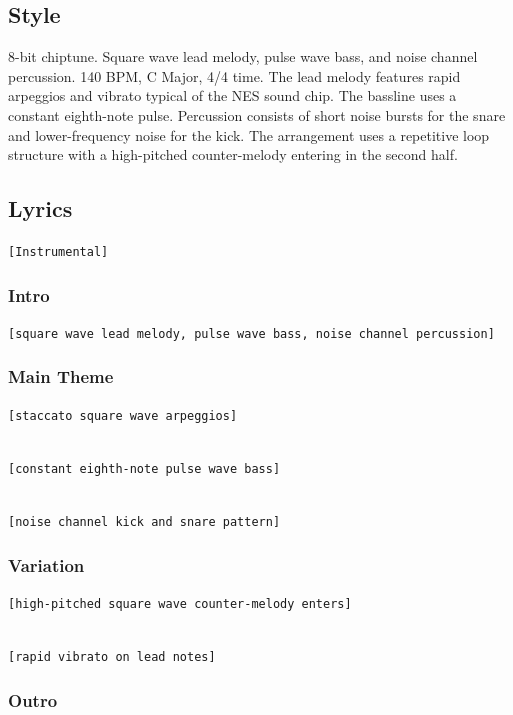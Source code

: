 \subsection{Style}\label{style-29}

8-bit chiptune. Square wave lead melody, pulse wave bass, and noise
channel percussion. 140 BPM, C Major, 4/4 time. The lead melody features
rapid arpeggios and vibrato typical of the NES sound chip. The bassline
uses a constant eighth-note pulse. Percussion consists of short noise
bursts for the snare and lower-frequency noise for the kick. The
arrangement uses a repetitive loop structure with a high-pitched
counter-melody entering in the second half.

\subsection{Lyrics}\label{lyrics-29}

\texttt{{[}Instrumental{]}}

\subsubsection{Intro}\label{intro-5}

\texttt{{[}square\ wave\ lead\ melody,\ pulse\ wave\ bass,\ noise\ channel\ percussion{]}}

\subsubsection{Main Theme}\label{main-theme}

\texttt{{[}staccato\ square\ wave\ arpeggios{]}}\strut \\
\texttt{{[}constant\ eighth-note\ pulse\ wave\ bass{]}}\strut \\
\texttt{{[}noise\ channel\ kick\ and\ snare\ pattern{]}}

\subsubsection{Variation}\label{variation}

\texttt{{[}high-pitched\ square\ wave\ counter-melody\ enters{]}}\strut \\
\texttt{{[}rapid\ vibrato\ on\ lead\ notes{]}}

\subsubsection{Outro}\label{outro-9}

